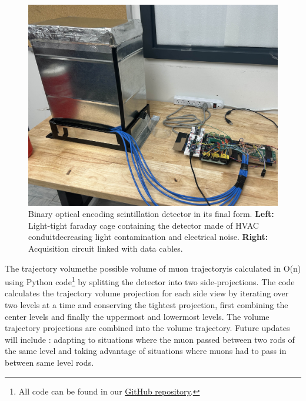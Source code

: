 \begin{figure} [h]
    \centering
    \includegraphics[scale=0.097]{figures/big detector.jpg}
    \caption{Binary optical encoding scintillation detector in its final form. \textbf{Left:} Light-tight faraday cage containing the detector made of HVAC conduit\textemdash decreasing light contamination and electrical noise. \textbf{Right:} Acquisition circuit linked with data cables.}
    \label{fig4}
\end{figure}

\vspace{15mm}
The trajectory volume\textemdash the possible volume of muon trajectory\textemdash is calculated in O(n) using Python code\footnote{All code can be found in our \href{https://github.com/ThatAquarel/hep}{\underline{GitHub repository}}.} by splitting the detector into two side-projections. The code calculates the trajectory volume projection for each side view by iterating over two levels at a time and conserving the tightest projection, first combining the center levels and finally the uppermost and lowermost levels. The volume trajectory projections are combined into the volume trajectory. Future updates will include : adapting to situations where the muon passed between two rods of the same level and taking advantage of situations where muons had to pass in between same level rods. 

 

